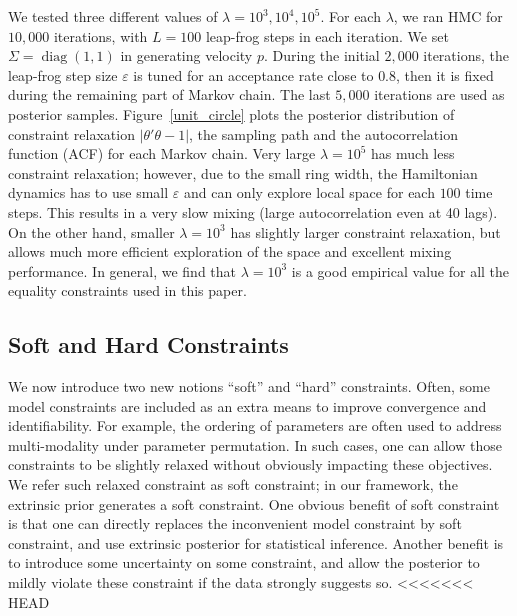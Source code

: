 \documentclass[10pt]{article}
\newcommand{\leo}[1]{{\color{blue}{LD: #1}}}
\DeclareMathOperator{\diag}{diag}
\DeclareMathOperator{\1}{\mathbbm{1}}
\begin{document}
We tested three different values of $\lambda = 10^3,10^4,10^5$. For each $\lambda$, we ran HMC for $10,000$ iterations, with $L=100$ leap-frog steps in each iteration. 
We set $\Sigma= \diag(1,1)$ in generating velocity $p$. During the initial $2,000$ iterations, the leap-frog step size $\varepsilon$ is tuned for an acceptance rate close to $0.8$, then it is fixed during the remaining part of Markov chain. The last $5,000$ iterations are used as posterior samples. Figure~\ref{unit_circle} plots the posterior distribution of constraint relaxation $|\theta'\theta -1|$, the sampling path and the autocorrelation function (ACF) for each Markov chain. Very large $\lambda=10^5$ has much less constraint relaxation; however, due to the small ring width, the Hamiltonian dynamics has to use small $\varepsilon$ and can only explore local space for each $100$ time steps. This results in a very slow mixing (large autocorrelation even at 40 lags). On the other hand, smaller $\lambda=10^3$ has slightly larger constraint relaxation, but allows much more efficient exploration of the space and excellent mixing performance. In general, we find that $\lambda=10^3$ is a good empirical value for all the equality constraints used in this paper.

\subsection{Soft and Hard Constraints}

We now introduce two new notions ``soft'' and ``hard'' constraints. Often, some model constraints are included as an extra means to improve convergence and identifiability. For example, the ordering of parameters are often used to address multi-modality under parameter permutation. In such cases, one can allow those constraints to be slightly relaxed without obviously impacting these objectives. We refer such relaxed constraint as soft constraint; in our framework, the extrinsic prior generates a soft constraint. One obvious benefit of soft constraint is that one can directly replaces the inconvenient model constraint by soft constraint, and use extrinsic posterior for statistical inference. Another benefit is to introduce some uncertainty on some constraint, and  allow the posterior to mildly violate these constraint if the data strongly suggests so.
<<<<<<< HEAD

\end{document}
